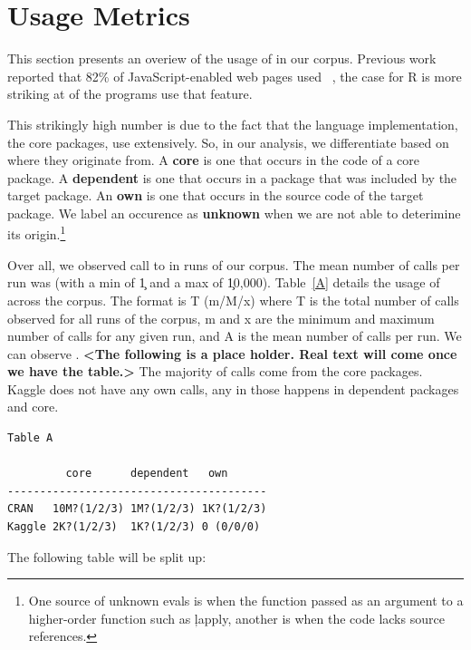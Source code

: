 \documentclass[conference]{IEEEtran}
\begin{document}
\section{Usage Metrics}

This section presents an overiew of the usage of \eval in our corpus.
Previous work reported that 82\% of JavaScript-enabled web pages used
\eval~\cite{ecoop11}, the case for R is more striking at  of the
programs use that feature.

This strikingly high number is due to the fact that the language
implementation, the core packages, use \eval extensively. So, in our
analysis, we differentiate \eval based on where they originate from. A {\bf
  core} \eval is one that occurs in the code of a core package.  A {\bf
  dependent} \eval is one that occurs in a package that was included by the
target package. An {\bf own} \eval is one that occurs in the source code of
the target package. We label an \eval occurence as {\bf unknown} when we are
not able to deterimine its origin.\footnote{One source of unknown evals is
  when the \eval function passed as an argument to a higher-order function
  such as \c{lapply}, another is when the code lacks source references.}

Over all, we observed \AllAllCallCountRnd call to \eval in  runs
of our corpus. The mean number of calls per run was  (with a min of
\c{1} and a max of \c{10,000}). Table~\ref{A} details the usage of \eval
across the corpus.  The format is T (m/M/x) where T is the total number of
calls observed for all runs of the corpus, m and x are the minimum and
maximum number of calls for any given run, and A is the mean number of calls
per run.  We can observe . {\bf <The following is a place
  holder. Real text will come once we have the table.>} The majority of
calls come from the core packages.  Kaggle does not have any own calls, any
\eval in those happens in dependent packages and core.

\begin{verbatim}
Table A

         core      dependent   own
----------------------------------------
CRAN   10M?(1/2/3) 1M?(1/2/3) 1K?(1/2/3)
Kaggle 2K?(1/2/3)  1K?(1/2/3) 0 (0/0/0)
\end{verbatim}


The following table will be split up:
\end{document}
